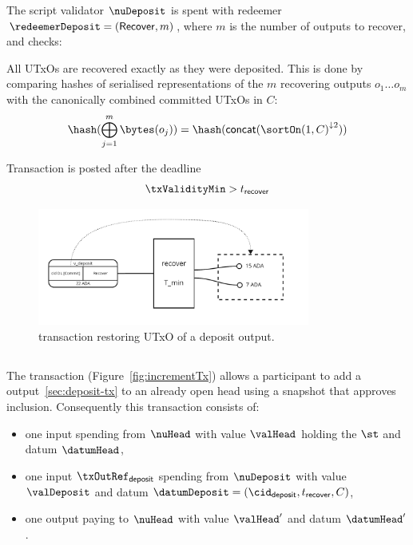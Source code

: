 \noindent The script validator $\nuDeposit$ is spent with redeemer
$\redeemerDeposit = (\mathsf{Recover}, m)$, where $m$ is the number of outputs
to recover, and checks:
\begin{menumerate}
  \item All UTxOs are recovered exactly as they were deposited. This is done by
  comparing hashes of serialised representations of the $m$ recovering outputs
  $o_{1} \dots o_{m}$ with the canonically combined committed UTxOs in $C$:
  \[
    \hash(\bigoplus_{j=1}^{m} \bytes(o_{j})) = \hash(\mathsf{concat}({\sortOn(1, C)}^{\downarrow2}))
  \]
  \item Transaction is posted after the deadline
  \[
    \txValidityMin > t_{\mathsf{recover}}
  \]
\end{menumerate}

\begin{figure}
  \centering
  \includegraphics[width=0.8\textwidth]{Hydra/Protocol/Figures/recover-tx}
  \caption{\mtxRecover{} transaction restoring UTxO of a deposit
	output.}\label{fig:recoverTx}
\end{figure}

\subsection{}\label{sec:increment-tx}

\noindent The \mtxIncrement{} transaction (Figure~\ref{fig:incrementTx}) allows
a participant to add a \mtxDeposit{} output~\ref{sec:deposit-tx} to an already
open head using a snapshot that approves inclusion. Consequently this
transaction consists of:

\begin{itemize}
  \item one input spending from $\nuHead$ with value $\valHead$ holding the
        $\st$ and datum $\datumHead$,
  \item one input $\txOutRef_{\mathsf{deposit}}$ spending from $\nuDeposit$ with value $\valDeposit$ and datum
        $\datumDeposit = (\cid_{\mathsf{deposit}}, t_{\mathsf{recover}}, C)$,
  \item one output paying to $\nuHead$ with value $\valHead'$ and datum
        $\datumHead'$.
\end{itemize}

